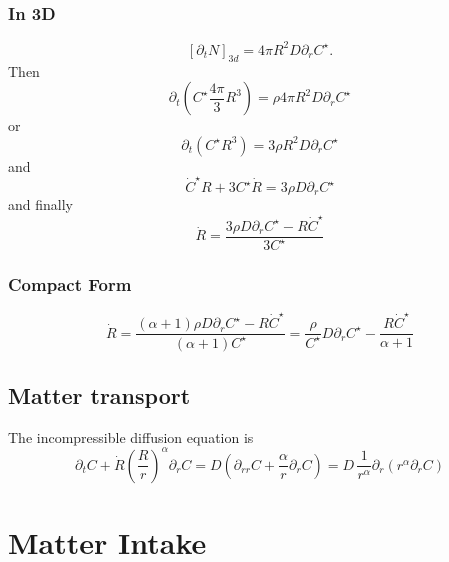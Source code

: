\documentclass[11pt]{revtex4}
\begin{document}
\subsubsection{In 3D}
\begin{equation}
	\left[\partial_t N\right]_{3d} =  4\pi R^2 D \partial_r C^\star.
\end{equation}
Then
\begin{equation}
	\partial_t\left( C^\star \dfrac{4\pi}{3} R^3 \right) = \rho   4\pi R^2 D \partial_r C^\star
\end{equation}
or
\begin{equation}
	\partial_t\left( C^\star R^3\right) = 3\rho R^2 D \partial_r C^\star
\end{equation}
and
\begin{equation}
	\dot{C}^\star R + 3 C^\star \dot{R}  = 3\rho  D \partial_r C^\star
\end{equation}
and finally
\begin{equation}
	\dot{R} = \dfrac{3\rho  D \partial_r C^\star - R\dot{C}^\star}{3C^\star}
\end{equation}

\subsubsection{Compact Form}
\begin{equation}
	\dot{R} = \dfrac{(\alpha+1)\rho  D \partial_r C^\star - R\dot{C}^\star}{(\alpha+1)C^\star} = \dfrac{\rho}{C^\star} D\partial_rC^\star - \dfrac{R\dot{C}^\star}{\alpha+1}
\end{equation}

\subsection{Matter transport}
The incompressible diffusion equation is
\begin{equation}
	\partial_t C + \dot{R} \left(\dfrac{R}{r}\right)^\alpha  \partial_r C = D \left( \partial_{rr} C + \dfrac{\alpha}{r} \partial_r C \right) = D \, \dfrac{1}{r^\alpha} \partial_r \left(r^\alpha\partial_r C\right)
\end{equation}



\section{Matter Intake}
\end{document}
